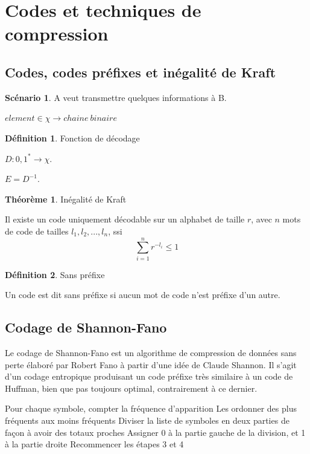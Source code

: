 \documentclass[10pt,a4paper]{article}
\theoremstyle{definition}
\newtheorem{theorem}{Théorème}
\newtheorem{definition}{Définition}
\newtheorem{scenario}{Scénario}
\numberwithin{lemma}{subsection}
\numberwithin{theorem}{subsection}
\numberwithin{definition}{subsection}
\numberwithin{proposition}{subsection}
\numberwithin{corollary}{subsection}
\numberwithin{property}{subsection}
\numberwithin{example}{subsection}
\numberwithin{heuristique}{subsection}
\numberwithin{scenario}{subsection}
\begin{document}
\section{Codes et techniques de compression}
	\subsection{Codes, codes préfixes et inégalité de Kraft}

\begin{scenario}
A veut transmettre quelques informations à B.
\end{scenario}

$element \in \chi \rightarrow chaine ~binaire$

\begin{definition}{Fonction de décodage}
\par $D : {0,1}^* \rightarrow \chi$.
\par $E = D^{-1}$.
\end{definition}

\begin{theorem}{Inégalité de Kraft}
\par Il existe un code uniquement décodable sur un alphabet de taille $r$, avec $n$ mots de code de tailles $l_1, l_2, ..., l_n$, ssi $$\sum_{i=1}^n r^{-l_i} \leqslant 1$$
\end{theorem}

\begin{definition}{Sans préfixe}
\par Un code est dit sans préfixe si aucun mot de code n'est préfixe d'un autre.
\end{definition}

	\subsection{Codage de Shannon-Fano}
	
Le codage de Shannon-Fano est un algorithme de compression de données sans perte élaboré par Robert Fano à partir d'une idée de Claude Shannon.
Il s'agit d'un codage entropique produisant un code préfixe très similaire à un code de Huffman, bien que pas toujours optimal, contrairement à ce dernier.

\begin{algorithm}[H]
\caption{Algorithme de Shannon-Fano}
Pour chaque symbole, compter la fréquence d'apparition\;
Les ordonner des plus fréquents aux moins fréquents \;
Diviser la liste de symboles en deux parties de façon à avoir des totaux proches \;
Assigner 0 à la partie gauche de la division, et 1 à la partie droite \;
Recommencer les étapes 3 et 4\;
\end{algorithm}
\end{document}
